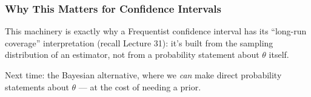 \documentclass[slidestop,compress,mathserif]{beamer}
\begin{document}
\begin{frame}
    \frametitle{Why This Matters for Confidence Intervals}
    This machinery is exactly why a Frequentist confidence interval has its ``long-run coverage'' interpretation (recall Lecture 31): it's built from the sampling distribution of an estimator, not from a probability statement about $\theta$ itself.
    \pause

    \medskip
    Next time: the Bayesian alternative, where we \emph{can} make direct probability statements about $\theta$ --- at the cost of needing a prior.
\end{frame}

\end{document}
